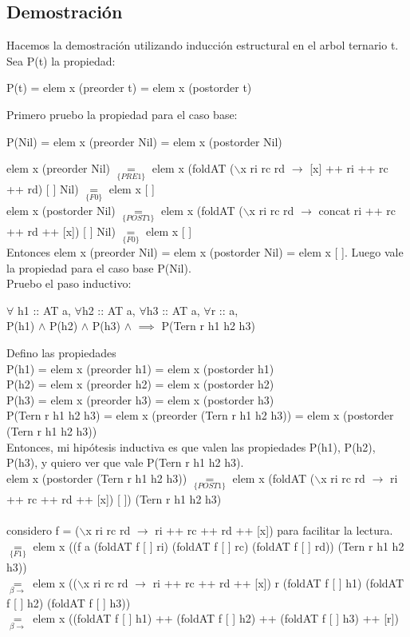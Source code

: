 \documentclass[10pt,a4paper]{article}
\begin{document}
\subsection*{Demostración}
Hacemos la demostración utilizando inducción estructural en el arbol ternario t. Sea P(t) la propiedad:
\begin{center}
	P(t) = elem x (preorder t) = elem x (postorder t)
\end{center}
Primero pruebo la propiedad para el caso base: 
\begin{center}
	P(Nil) = elem x (preorder Nil) = elem x (postorder Nil)
\end{center}
elem x (preorder Nil) $\underset{\{PRE1\}}{=}$ elem x (foldAT ($\backslash$x ri rc rd $\rightarrow$ [x] ++ ri ++ rc ++ rd) [ ] Nil) $\underset{\{F0\}}{=}$ elem x [ ] \\
elem x (postorder Nil) $\underset{\{POST1\}}{=}$ elem x (foldAT ($\backslash$x ri rc rd $\rightarrow$ concat ri ++ rc ++ rd ++ [x]) [ ] Nil) $\underset{\{F0\}}{=}$ elem x [ ] \\

\noindent
Entonces elem x (preorder Nil) = elem x (postorder Nil) = elem x [ ]. Luego vale la propiedad para el caso base P(Nil).
\\
Pruebo el paso inductivo: 
\begin{center}
	$\forall$ h1 :: AT a, $\forall$h2 :: AT a, $\forall$h3 :: AT a, $\forall$r :: a, \\
	P(h1) $\land$ P(h2) $\land$ P(h3) $\land$ $\implies$ P(Tern r h1 h2 h3)
\end{center}
Defino las propiedades \\
P(h1) = elem x (preorder h1) = elem x (postorder h1) \\
P(h2) = elem x (preorder h2) = elem x (postorder h2) \\
P(h3) = elem x (preorder h3) = elem x (postorder h3) \\
P(Tern r h1 h2 h3) = elem x (preorder (Tern r h1 h2 h3)) = elem x (postorder (Tern r h1 h2 h3)) \\
\noindent
Entonces, mi hipótesis inductiva es que valen las propiedades P(h1), P(h2), P(h3), y quiero ver que vale P(Tern r h1 h2 h3). \\

\noindent
elem x (postorder (Tern r h1 h2 h3)) $\underset{\{POST1\}}{=}$ elem x (foldAT ($\backslash$x ri rc rd $\rightarrow$ ri ++ rc ++ rd ++ [x]) [ ]) (Tern r h1 h2 h3) \\
\\
considero f = ($\backslash$x ri rc rd $\rightarrow$ ri ++ rc ++ rd ++ [x]) para facilitar la lectura.\\ 
$\underset{\{F1\}}{=}$ elem x ((f a (foldAT f [ ] ri) (foldAT f [ ] rc) (foldAT f [ ] rd)) (Tern r h1 h2 h3)) \\
$\underset{\beta\rightarrow}{=}$ elem x (($\backslash$x ri rc rd $\rightarrow$ ri ++ rc ++ rd ++ [x]) r (foldAT f [ ] h1) (foldAT f [ ] h2) (foldAT f [ ] h3))\\
$\underset{\beta\rightarrow}{=}$ elem x ((foldAT f [ ] h1) ++ (foldAT f [ ] h2) ++ (foldAT f [ ] h3) ++ [r])\\
\end{document}
